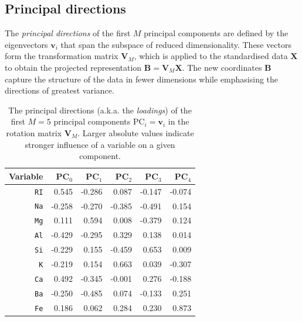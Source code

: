 \documentclass[dtu]{dtuarticle}
\begin{document}
	\subsection{Principal directions}

	The \textit{principal directions} of the first $M$ principal components are defined by the eigenvectors $\bm{v}_i$ that span the subspace of reduced dimensionality. These vectors form the transformation matrix $\bm{V}_M$, which is applied to the standardised data $\bm{X}$ to obtain the projected representation $\bm{B} = \bm{V}_M \bm{X}$. The new coordinates $\bm{B}$ capture the structure of the data in fewer dimensions while emphasising the directions of greatest variance.

	\begin{table}[h!]
		\centering
		\begin{tabular}{r | *{5}{|r}}
			\textbf{Variable} & $\textbf{PC}_0$ & $\textbf{PC}_1$ & $\textbf{PC}_2$ & $\textbf{PC}_3$ & $\textbf{PC}_4$ \\ \hline\hline
			\texttt{RI} & \num{0.545}     &          -0.286 &           0.087 &          -0.147 &          -0.074 \\
			\texttt{Na} & -0.258          &          -0.270 &          -0.385 &          -0.491 &           0.154 \\
			\texttt{Mg} & 0.111           &           0.594 &           0.008 &          -0.379 &           0.124 \\
			\texttt{Al} & -0.429          &          -0.295 &           0.329 &           0.138 &           0.014 \\
			\texttt{Si} & -0.229          &           0.155 &          -0.459 &           0.653 &           0.009 \\
			\texttt{K} & -0.219          &           0.154 &           0.663 &           0.039 &          -0.307 \\
			\texttt{Ca} & 0.492           &          -0.345 &          -0.001 &           0.276 &          -0.188 \\
			\texttt{Ba} & -0.250          &          -0.485 &           0.074 &          -0.133 &           0.251 \\
			\texttt{Fe} & 0.186           &           0.062 &           0.284 &           0.230 &           0.873
		\end{tabular}
		\caption{The principal directions (a.k.a. the \textit{loadings}) of the first $M=5$ principal components $\text{PC}_i = \bm{v}_i$ in the rotation matrix $\bm{V}_M$. Larger absolute values indicate stronger influence of a variable on a given component.}
		\label{table:loadings}
	\end{table}
\end{document}
